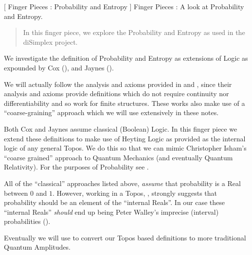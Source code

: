 
[
  Finger Pieces : Probability and Entropy
]{
  Finger Pieces : A look at Probability and Entropy.
}
\author{Stephen Gaito}

\maketitle

\begin{abstract}
  In this finger piece, we explore the Probability and Entropy as used in the
  diSimplex project.
\end{abstract}

We investigate the definition of Probability and Entropy as extensions of Logic
as expounded by Cox (\cite{cox1962algProbableInference}), and Jaynes
(\cite{jaynes1994probTh}).

We will actually follow the analysis and axioms provided in
\cite{arnborgSjödin2000bayesRulesFiniteModels} and
\cite{dupréTipler2009axiomsBayesianProb}, since their analysis and axioms
provide definitions which do not require continuity nor differentiability
and so work for finite structures. These works also make use of a
``coarse-graining'' approach which we will use extensively in these notes.

Both Cox and Jaynes assume classical (Boolean) Logic. In this finger piece we
extend these definitions to make use of Heyting Logic as provided as the
internal logic of any general Topos. We do this so that we can mimic Christopher
Isham's ``coarse grained'' approach to Quantum Mechanics (and eventually Quantum
Relativity). For the purposes of Probability see
\cite{isham2002reflectionsConventionalGravity}.

All of the ``classical'' approaches listed above, \emph{assume} that probability
is a Real between $0$ and $1$. However, working in a Topos,
\cite{isham2002reflectionsConventionalGravity}, strongly suggests that
probability should be an element of the ``internal Reals''. In our case these
``internal Reals'' \emph{should} end up being Peter Walley's imprecise
(interval) probabilities (\cite{walley1991impreciseProb}).

Eventually we will use \cite{goyalKnuthSkilling2009complexQuantumAmplitudes} to
convert our Topos based definitions to more traditional Quantum Amplitudes.
